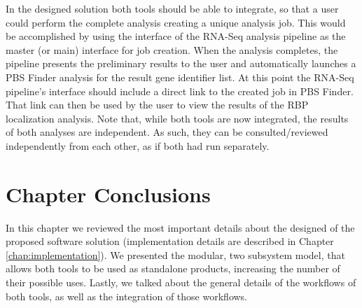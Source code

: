 In the designed solution both tools should be able to integrate, so that a user
could perform the complete analysis creating a unique analysis job. This would
be accomplished by using the interface of the RNA-Seq analysis pipeline as the
master (or main) interface for job creation. When the analysis completes, the
pipeline presents the preliminary results to the user and automatically launches
a PBS Finder analysis for the result gene identifier list. At this point the
RNA-Seq pipeline's interface should include a direct link to the created job in
PBS Finder. That link can then be used by the user to view the results of the
RBP localization analysis. Note that, while both tools are now integrated, the
results of both analyses are independent. As such, they can be
consulted/reviewed independently from each other, as if both had run separately.

\section{Chapter Conclusions}


In this chapter we reviewed the most important details about the designed of the
proposed software solution (implementation details are described in Chapter
\ref{chap:implementation}). We presented the modular, two subsystem model, that
allows both tools to be used as standalone products, increasing the number of
their possible uses. Lastly, we talked about the general details of the
workflows of both tools, as well as the integration of those workflows.
